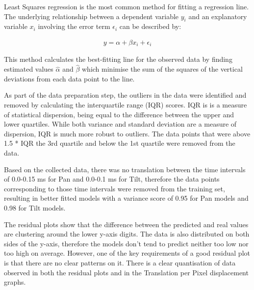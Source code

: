 \documentclass{l4proj}
\begin{document}
Least Squares regression is the most common method for fitting a regression line. The underlying relationship between a dependent variable $y_{i}$ and an explanatory variable $x_{i}$ involving the error term $\epsilon_{i}$ can be described by:

\begin{align}
y = \alpha + \beta x_{i} + \epsilon _{i}
\end{align}


This method calculates the best-fitting line for the observed data by finding estimated values $ \hat{\alpha} $ and $\hat{\beta}$ which minimise the sum of the squares of the vertical deviations from each data point to the line. 

As part of the data preparation step, the outliers in the data were identified and removed by calculating the interquartile range (IQR) scores. IQR is is a measure of statistical dispersion, being equal to the difference between the upper and lower quartiles. While both variance and standard deviation are a measure of dispersion, IQR is much more robust to outliers. The data points that  were above 1.5 * IQR the 3rd quartile and below the 1st quartile were removed from the data. 

Based on the collected data, there was no translation between the time intervals of 0.0-0.15 ms for Pan and 0.0-0.1 ms for Tilt, therefore the data points corresponding to those time intervals were removed from the training set, resulting in better fitted models with a variance score of 0.95 for Pan models and 0.98 for Tilt models. 

The residual plots show that the difference between the predicted and real values are clustering around the lower y-axis digits. The data is also distributed on both sides of the y-axis, therefore the models don't tend to predict neither too low nor too high on average. However, one of the key requirements of a good residual plot is that there are no clear patterns on it. There is a clear quantisation of data observed in both the residual plots and in the Translation per Pixel displacement graphs. 
\end{document}
